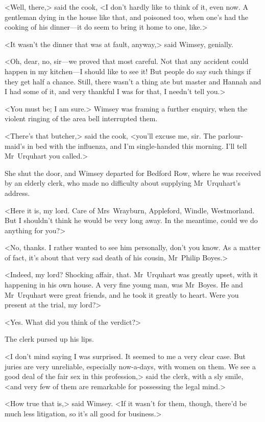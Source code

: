 <Well, there,> said the cook, <I don't hardly like to think of it, even now. A gentleman dying in the house like that, and poisoned too, when one's had the cooking of his dinner—it do seem to bring it home to one, like.>

<It wasn't the dinner that was at fault, anyway,> said Wimsey, genially.

<Oh, dear, no, sir—we proved that most careful. Not that any accident could happen in my kitchen—I should like to see it! But people do say such things if they get half a chance. Still, there wasn't a thing ate but master and Hannah and I had some of it, and very thankful I was for that, I needn't tell you.>

<You must be; I am sure.> Wimsey was framing a further enquiry, when the violent ringing of the area bell interrupted them.

<There's that butcher,> said the cook, <you'll excuse me, sir. The parlour-maid's in bed with the influenza, and I'm single-handed this morning. I'll tell Mr~Urquhart you called.>

She shut the door, and Wimsey departed for Bedford Row, where he was received by an elderly clerk, who made no difficulty about supplying Mr~Urquhart's address.

<Here it is, my lord. Care of Mrs~Wrayburn, Appleford, Windle, Westmorland. But I shouldn't think he would be very long away. In the meantime, could we do anything for you?>

<No, thanks. I rather wanted to see him personally, don't you know. As a matter of fact, it's about that very sad death of his cousin, Mr~Philip Boyes.>

<Indeed, my lord? Shocking affair, that. Mr~Urquhart was greatly upset, with it happening in his own house. A very fine young man, was Mr~Boyes. He and Mr~Urquhart were great friends, and he took it greatly to heart. Were you present at the trial, my lord?>

<Yes. What did you think of the verdict?>

The clerk pursed up his lips.

<I don't mind saying I was surprised. It seemed to me a very clear case. But juries are very unreliable, especially now-a-days, with women on them. We see a good deal of the fair sex in this profession,> said the clerk, with a sly smile, <and very few of them are remarkable for possessing the legal mind.>

<How true that is,> said Wimsey. <If it wasn't for them, though, there'd be much less litigation, so it's all good for business.>

